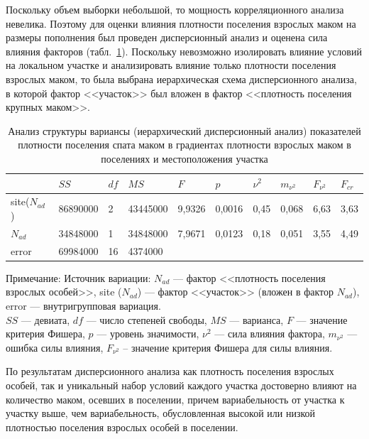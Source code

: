 Поскольку объем выборки небольшой, то мощность корреляционного анализа невелика. 
Поэтому для оценки влияния плотности поселения взрослых маком на размеры пополнения был проведен дисперсионный анализ и оценена сила влияния факторов (табл.~\ref{tab:ANOVA_site_Nad_spat}).
Поскольку невозможно изолировать влияние условий на локальном участке и анализировать влияние только плотности поселения взрослых маком, то была выбрана иерархическая схема дисперсионного анализа, в которой фактор <<участок>> был вложен в фактор <<плотность поселения крупных маком>>.
\begin{table}[p]
\caption{Анализ структуры вариансы (иерархический дисперсионный анализ) показателей плотности поселения спата маком в градиентах плотности взрослых маком в поселениях и местоположения участка}
\label{tab:ANOVA_site_Nad_spat}
\begin{center}
\begin{tabular}{|l|lll|ll|ll|ll|}
\hline
                & $SS$        & $df$ & $MS$       & $F$      & $p$        & $\nu^2$      & $m_{\nu^2}$       & $F_{\nu^2}$            & $F_{cr}$  \\ \hline
  site($N_{ad}$) & 86890000  & 2  & 43445000 & 9,9326 & 0,0016 & 0,45 & 0,068 & 6,63 & 3,63 \\
$N_{ad}$         & 34848000  & 1  & 34848000 & 7,9671 & 0,0123 & 0,18 & 0,051 & 3,55 & 4,49 \\
error       & 69984000  & 16 & 4374000  &        &          &              &              &              &      \\ \hline
\end{tabular}
\end{center}

\footnotesize{Примечание: Источник вариации: $N_{ad}$ --- фактор <<плотность поселения взрослых особей>>, 
site ($N_{ad}$) --- фактор <<участок>> (вложен в фактор $N_{ad}$),
error ---  внутригрупповая вариация. \\
$SS$ --- девиата, 
$df$ --- число степеней свободы, 
$MS$ --- варианса, 
$F$ --- значение критерия Фишера, 
$p$  --- уровень значимости,
$\nu^2$ --- сила влияния фактора,
$m_{\nu^2}$ --- ошибка силы влияния,
$F_{\nu^2}$ – значение критерия Фишера для силы влияния.}
\end{table}
По результатам дисперсионного анализа как плотность поселения взрослых особей, так и уникальный набор условий каждого участка достоверно влияют на количество маком, осевших в поселении, причем вариабельность от участка к участку выше, чем вариабельность, обусловленная высокой или низкой плотностью поселения взрослых особей в поселении. 

